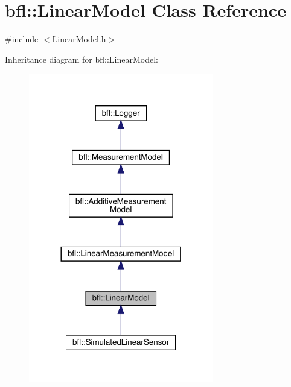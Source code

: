\hypertarget{classbfl_1_1LinearModel}{}\section{bfl\+:\+:Linear\+Model Class Reference}
\label{classbfl_1_1LinearModel}


{\ttfamily \#include $<$Linear\+Model.\+h$>$}



Inheritance diagram for bfl\+:\+:Linear\+Model\+:
\nopagebreak
\begin{figure}[H]
\begin{center}
\leavevmode
\includegraphics[width=228pt]{classbfl_1_1LinearModel__inherit__graph}
\end{center}
\end{figure}
